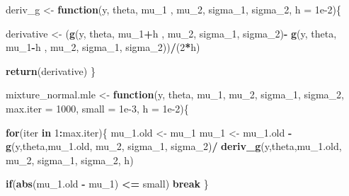 \documentclass[12pt]{article}
\newenvironment{Shaded}{\begin{snugshade}}{\end{snugshade}}
\newcommand{\ControlFlowTok}[1]{\textcolor[rgb]{0.13,0.29,0.53}{\textbf{#1}}}
\newcommand{\DataTypeTok}[1]{\textcolor[rgb]{0.13,0.29,0.53}{#1}}
\newcommand{\DecValTok}[1]{\textcolor[rgb]{0.00,0.00,0.81}{#1}}
\newcommand{\FloatTok}[1]{\textcolor[rgb]{0.00,0.00,0.81}{#1}}
\newcommand{\KeywordTok}[1]{\textcolor[rgb]{0.13,0.29,0.53}{\textbf{#1}}}
\newcommand{\NormalTok}[1]{#1}
\newcommand{\OperatorTok}[1]{\textcolor[rgb]{0.81,0.36,0.00}{\textbf{#1}}}
\newcommand{\StringTok}[1]{\textcolor[rgb]{0.31,0.60,0.02}{#1}}
\begin{document}
\begin{Shaded}
\begin{Highlighting}[]
\NormalTok{deriv\_g \textless{}{-}}\StringTok{ }\ControlFlowTok{function}\NormalTok{(y, theta, mu\_}\DecValTok{1}\NormalTok{ , mu\_}\DecValTok{2}\NormalTok{, sigma\_}\DecValTok{1}\NormalTok{, sigma\_}\DecValTok{2}\NormalTok{, }\DataTypeTok{h =} \FloatTok{1e{-}2}\NormalTok{)\{}
  
\NormalTok{   derivative \textless{}{-}}\StringTok{ }\NormalTok{(}\KeywordTok{g}\NormalTok{(y, theta, mu\_}\DecValTok{1}\OperatorTok{+}\NormalTok{h , mu\_}\DecValTok{2}\NormalTok{, sigma\_}\DecValTok{1}\NormalTok{, sigma\_}\DecValTok{2}\NormalTok{)}\OperatorTok{{-}}\StringTok{ }
\StringTok{                    }\KeywordTok{g}\NormalTok{(y, theta, mu\_}\DecValTok{1}\OperatorTok{{-}}\NormalTok{h , mu\_}\DecValTok{2}\NormalTok{, sigma\_}\DecValTok{1}\NormalTok{, sigma\_}\DecValTok{2}\NormalTok{))}\OperatorTok{/}\NormalTok{(}\DecValTok{2}\OperatorTok{*}\NormalTok{h)}
   
   \KeywordTok{return}\NormalTok{(derivative)}
\NormalTok{\}}
  
\NormalTok{mixture\_normal.mle \textless{}{-}}\StringTok{ }\ControlFlowTok{function}\NormalTok{(y, theta, mu\_}\DecValTok{1}\NormalTok{, mu\_}\DecValTok{2}\NormalTok{, sigma\_}\DecValTok{1}\NormalTok{, sigma\_}\DecValTok{2}\NormalTok{,}
                               \DataTypeTok{max.iter =} \DecValTok{1000}\NormalTok{, }\DataTypeTok{small =} \FloatTok{1e{-}3}\NormalTok{, }\DataTypeTok{h =} \FloatTok{1e{-}2}\NormalTok{)\{}
  
  \ControlFlowTok{for}\NormalTok{(iter }\ControlFlowTok{in} \DecValTok{1}\OperatorTok{:}\NormalTok{max.iter)\{}
\NormalTok{    mu\_}\FloatTok{1.}\NormalTok{old \textless{}{-}}\StringTok{ }\NormalTok{mu\_}\DecValTok{1}
\NormalTok{    mu\_}\DecValTok{1}\NormalTok{ \textless{}{-}}\StringTok{ }\NormalTok{mu\_}\FloatTok{1.}\NormalTok{old }\OperatorTok{{-}}\StringTok{ }\KeywordTok{g}\NormalTok{(y,theta,mu\_}\FloatTok{1.}\NormalTok{old, mu\_}\DecValTok{2}\NormalTok{, sigma\_}\DecValTok{1}\NormalTok{, sigma\_}\DecValTok{2}\NormalTok{)}\OperatorTok{/}
\StringTok{      }\KeywordTok{deriv\_g}\NormalTok{(y,theta,mu\_}\FloatTok{1.}\NormalTok{old, mu\_}\DecValTok{2}\NormalTok{, sigma\_}\DecValTok{1}\NormalTok{, sigma\_}\DecValTok{2}\NormalTok{, h)}
    
    \ControlFlowTok{if}\NormalTok{(}\KeywordTok{abs}\NormalTok{(mu\_}\FloatTok{1.}\NormalTok{old }\OperatorTok{{-}}\StringTok{ }\NormalTok{mu\_}\DecValTok{1}\NormalTok{) }\OperatorTok{\textless{}=}\StringTok{ }\NormalTok{small)}
      \ControlFlowTok{break}
\NormalTok{  \}}
    

\end{Highlighting}
\end{Shaded}
\end{document}
